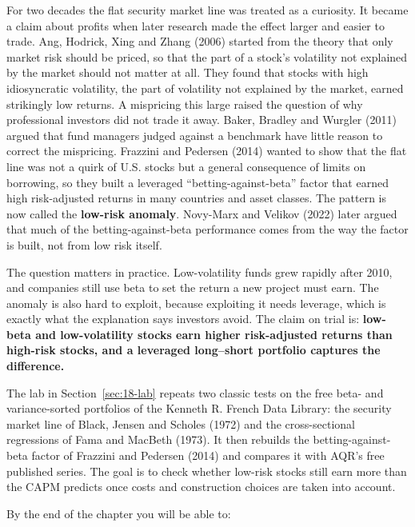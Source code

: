 For two decades the flat security market line was treated as a curiosity. It became a claim about profits when later research made the effect larger and easier to trade. Ang, Hodrick, Xing and Zhang (2006) started from the theory that only market risk should be priced, so that the part of a stock's volatility not explained by the market should not matter at all. They found that stocks with high idiosyncratic volatility, the part of volatility not explained by the market, earned strikingly low returns. A mispricing this large raised the question of why professional investors did not trade it away. Baker, Bradley and Wurgler (2011) argued that fund managers judged against a benchmark have little reason to correct the mispricing. Frazzini and Pedersen (2014) wanted to show that the flat line was not a quirk of U.S. stocks but a general consequence of limits on borrowing, so they built a leveraged ``betting-against-beta'' factor that earned high risk-adjusted returns in many countries and asset classes. The pattern is now called the \textbf{low-risk anomaly}. Novy-Marx and Velikov (2022) later argued that much of the betting-against-beta performance comes from the way the factor is built, not from low risk itself.

The question matters in practice. Low-volatility funds grew rapidly after 2010, and companies still use beta to set the return a new project must earn. The anomaly is also hard to exploit, because exploiting it needs leverage, which is exactly what the explanation says investors avoid. The claim on trial is: \textbf{low-beta and low-volatility stocks earn higher risk-adjusted returns than high-risk stocks, and a leveraged long--short portfolio captures the difference.}

The lab in Section~\ref{sec:18-lab} repeats two classic tests on the free beta- and variance-sorted portfolios of the Kenneth R. French Data Library: the security market line of Black, Jensen and Scholes (1972) and the cross-sectional regressions of Fama and MacBeth (1973). It then rebuilds the betting-against-beta factor of Frazzini and Pedersen (2014) and compares it with AQR's free published series. The goal is to check whether low-risk stocks still earn more than the CAPM predicts once costs and construction choices are taken into account.

By the end of the chapter you will be able to:

